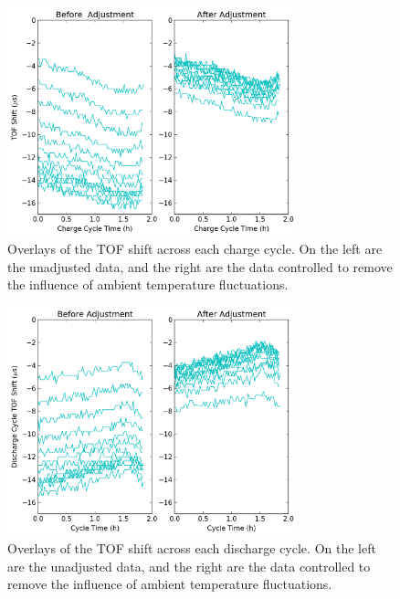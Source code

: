 \begin{figure}[t]\label{fig:0417chargeadj}
\includegraphics[width=0.75\textwidth]{Thesis/0417chargeAdjust.png}
\centering
\caption{Overlays of the TOF shift across each charge cycle. On the left are the unadjusted data, and the right are the data controlled to remove the influence of ambient temperature fluctuations.}
\end{figure}

\begin{figure}[t]\label{fig:0417dischargeadj}
\includegraphics[width=0.75\textwidth]{Thesis/0417dischargeAdjust.png}
\centering
\caption{Overlays of the TOF shift across each discharge cycle. On the left are the unadjusted data, and the right are the data controlled to remove the influence of ambient temperature fluctuations.}
\end{figure}

